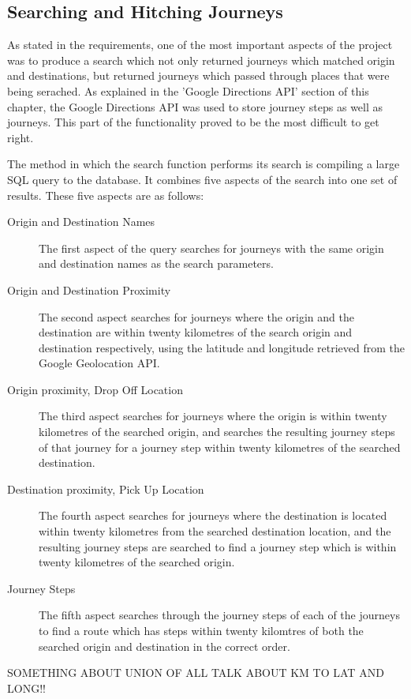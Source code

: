 \subsection{Searching and Hitching Journeys}
As stated in the requirements, one of the most important aspects of the project was to produce a search which not only returned journeys which matched origin and destinations, but returned journeys which passed through places that were being serached. As explained in the 'Google Directions API' section of this chapter, the Google Directions API was used to store journey steps as well as journeys. This part of the functionality proved to be the most difficult to get right.

The method in which the search function performs its search is compiling a large SQL query to the database. It combines five aspects of the search into one set of results. These five aspects are as follows:

\begin{description}
\item[Origin and Destination Names] The first aspect of the query searches for journeys with the same origin and destination names as the search parameters. 
\item[Origin and Destination Proximity] The second aspect searches for journeys where the origin and the destination are within twenty kilometres of the search origin and destination respectively, using the latitude and longitude retrieved from the Google Geolocation API.
\item[Origin proximity, Drop Off Location] The third aspect searches for journeys where the origin is within twenty kilometres of the searched origin, and searches the resulting journey steps of that journey for a journey step within twenty kilometres of the searched destination.
\item[Destination proximity, Pick Up Location] The fourth aspect searches for journeys where the destination is located within twenty kilometres from the searched destination location, and the resulting journey steps are searched to find a journey step which is within twenty kilometres of the searched origin.
\item[Journey Steps] The fifth aspect searches through the journey steps of each of the journeys to find a route which has steps within twenty kilomtres of both the searched origin and destination in the correct order.
\end{description}

SOMETHING ABOUT UNION OF ALL
TALK ABOUT KM TO LAT AND LONG!!

